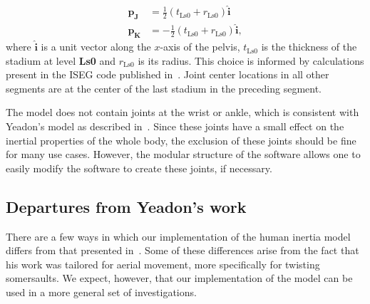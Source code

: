 \documentclass[10pt,a4paper,twocolumn]{article}
\begin{document}
\begin{align}
    \mathbf{p_J} &=
        \frac{1}{2} (t_{\textrm{Ls0}} + r_{\textrm{Ls0}})\hat{\mathbf{i}} \\
    \mathbf{p_K} &=
        -\frac{1}{2} (t_{\textrm{Ls0}} + r_{\textrm{Ls0}})\hat{\mathbf{i}},
\end{align}
where $\hat{\mathbf{i}}$ is a unit vector along the $x$-axis of the pelvis,
$t_{\textrm{Ls0}}$ is the thickness of the stadium at level \textbf{Ls0} and
$r_{\textrm{Ls0}}$ is its radius. This choice is informed by calculations
present in the ISEG code published in~\cite{Yeadon1984a}. Joint center
locations in all other segments are at the center of the last stadium in the
preceding segment.

The model does not contain joints at the wrist or ankle, which is consistent
with Yeadon's model as described in~\cite{Yeadon1990e}. Since these joints have
a small effect on the inertial properties of the whole body, the exclusion of
these joints should be fine for many use cases. However, the modular structure
of the software allows one to easily modify the software to create these
joints, if necessary.

\subsection*{Departures from Yeadon's work}

There are a few ways in which our implementation of the human inertia model
differs from that presented in~\cite{Yeadon1990c, Yeadon1990f, Yeadon1990e,
Yeadon1990d}. Some of these differences arise from the fact that his work was
tailored for aerial movement, more specifically for twisting somersaults. We
expect, however, that our implementation of the model can be used in a more
general set of investigations.
\end{document}
